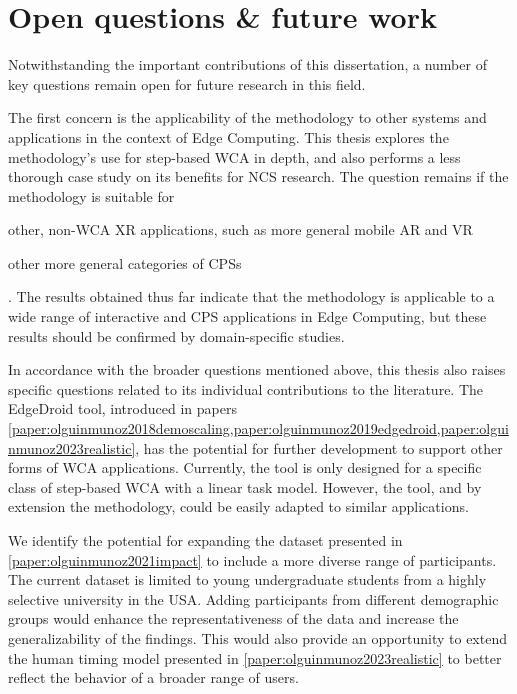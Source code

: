 \section{Open questions \& future work}

Notwithstanding the important contributions of this dissertation, a number of key questions remain open for future research in this field.

The first concern is the applicability of the methodology to other systems and applications in the context of Edge Computing.
This thesis explores the methodology's use for step-based \gls{WCA} in depth, and also performs a less thorough case study on its benefits for \gls{NCS} research.
The question remains if the methodology is suitable for
\begin{inlineenum}
    \item other, non-\gls{WCA} \gls{XR} applications, such as more general mobile \gls{AR} and \gls{VR}
    \item other more general categories of \glspl{CPS}
\end{inlineenum}.
The results obtained thus far indicate that the methodology is applicable to a wide range of interactive and \gls{CPS} applications in Edge Computing, but these results should be confirmed by domain-specific studies.

In accordance with the broader questions mentioned above, this thesis also raises specific questions related to its individual contributions to the literature.
The EdgeDroid tool, introduced in papers \cref{paper:olguinmunoz2018demoscaling,paper:olguinmunoz2019edgedroid,paper:olguinmunoz2023realistic}, has the potential for further development to support other forms of \gls{WCA} applications.
Currently, the tool is only designed for a specific class of step-based \gls{WCA} with a linear task model.
However, the tool, and by extension the methodology, could be easily adapted to similar applications.

We identify the potential for expanding the dataset presented in \cref{paper:olguinmunoz2021impact} to include a more diverse range of participants.
The current dataset is limited to young undergraduate students from a highly selective university in the \gls{USA}.
Adding participants from different demographic groups would enhance the representativeness of the data and increase the generalizability of the findings.
This would also provide an opportunity to extend the human timing model presented in \cref{paper:olguinmunoz2023realistic} to better reflect the behavior of a broader range of users.

